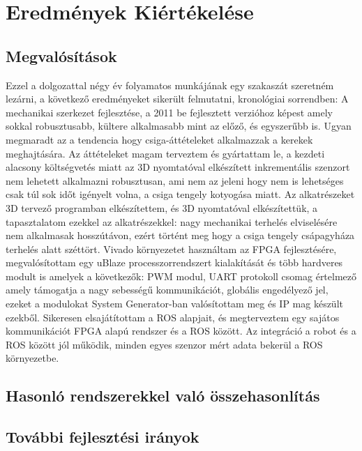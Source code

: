\chapter{Eredmények Kiértékelése}
\section{Megvalósítások}
Ezzel a dolgozattal négy év folyamatos munkájának egy szakaszát szeretném lezárni, a következő eredményeket sikerült felmutatni, kronológiai sorrendben: 
A mechanikai szerkezet fejlesztése, a 2011 be fejlesztett verzióhoz képest amely sokkal robusztusabb, kültere alkalmasabb mint az előző, és egyszerűbb is. Ugyan megmaradt az a tendencia hogy csiga-áttételeket alkalmazzak a kerekek meghajtására. Az áttételeket magam terveztem és gyártattam le, a kezdeti alacsony költségvetés miatt az 3D nyomtatóval elkészített inkrementális szenzort nem lehetett alkalmazni robusztusan, ami nem az jeleni hogy nem is lehetséges csak túl sok időt igényelt volna, a csiga tengely kotyogása miatt.
Az alkatrészeket 3D tervező programban elkészítettem, és 3D nyomtatóval elkészítettük, a tapasztalatom ezekkel az alkatrészekkel: nagy mechanikai terhelés elviselésére nem alkalmasak hosszútávon, ezért történt meg hogy a csiga tengely csápagyháza terhelés alatt széttört.
Vivado környezetet használtam az FPGA fejlesztésére, megvalósítottam egy uBlaze processzorrendszert kialakítását és több hardveres modult is amelyek a következők: PWM modul, UART protokoll csomag értelmező amely támogatja a nagy sebességű kommunikációt, globális engedélyező jel, ezeket a modulokat System Generator-ban valósítottam meg és IP mag készült ezekből.
Sikeresen elsajátítottam a ROS alapjait, és megterveztem egy sajátos kommunikációt FPGA alapú rendszer és a ROS között. Az integráció a robot és a ROS között jól működik, minden egyes szenzor mért adata bekerül a ROS környezetbe.


\section{Hasonló rendszerekkel való összehasonlítás}
\section{További fejlesztési irányok}